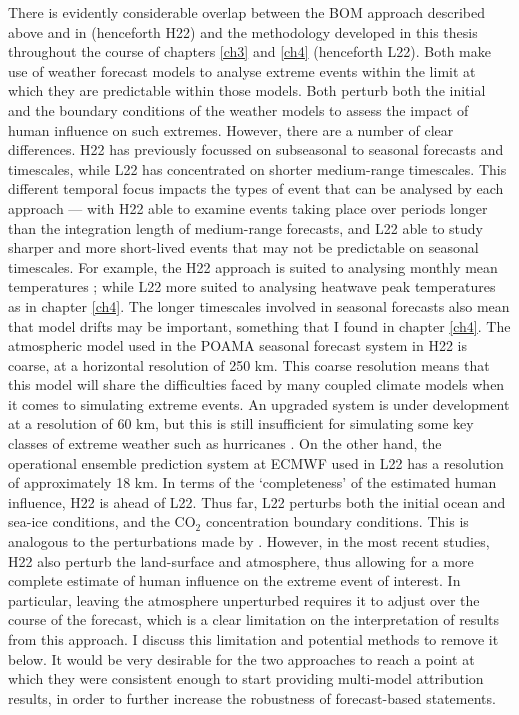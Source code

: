     There is evidently considerable overlap between the BOM approach described above and in \citet{hope_subseasonal_2022} (henceforth H22) and the methodology developed in this thesis throughout the course of chapters \ref{ch3} and \ref{ch4} (henceforth L22). Both make use of weather forecast models to analyse extreme events within the limit at which they are predictable within those models. Both perturb both the initial and the boundary conditions of the weather models to assess the impact of human influence on such extremes. However, there are a number of clear differences. H22 has previously focussed on subseasonal to seasonal forecasts and timescales, while L22 has concentrated on shorter medium-range timescales. This different temporal focus impacts the types of event that can be analysed by each approach --- with H22 able to examine events taking place over periods longer than the integration length of medium-range forecasts, and L22 able to study sharper and more short-lived events that may not be predictable on seasonal timescales. For example, the H22 approach is suited to analysing monthly mean temperatures \citep{hope_contributors_2015}; while L22 more suited to analysing heatwave peak temperatures as in chapter \ref{ch4}. The longer timescales involved in seasonal forecasts also mean that model drifts may be important, something that I found in chapter \ref{ch4}. The atmospheric model used in the POAMA seasonal forecast system in H22 is coarse, at a horizontal resolution of 250 km. This coarse resolution means that this model will share the difficulties faced by many coupled climate models when it comes to simulating extreme events. An upgraded system is under development at a resolution of 60 km, but this is still insufficient for simulating some key classes of extreme weather such as hurricanes \citep{hope_subseasonal_2022,patricola_anthropogenic_2018}. On the other hand, the operational ensemble prediction system at ECMWF used in L22 has a resolution of approximately 18 km. In terms of the `completeness' of the estimated human influence, H22 is ahead of L22. Thus far, L22 perturbs both the initial ocean and sea-ice conditions, and the CO$_2$ concentration boundary conditions. This is analogous to the perturbations made by \citet[][though they did not perturb the sea ice]{hope_contributors_2015}. However, in the most recent studies, H22 also perturb the land-surface and atmosphere, thus allowing for a more complete estimate of human influence on the extreme event of interest. In particular, leaving the atmosphere unperturbed requires it to adjust over the course of the forecast, which is a clear limitation on the interpretation of results from this approach. I discuss this limitation and potential methods to remove it below. It would be very desirable for the two approaches to reach a point at which they were consistent enough to start providing multi-model attribution results, in order to further increase the robustness of forecast-based statements.

